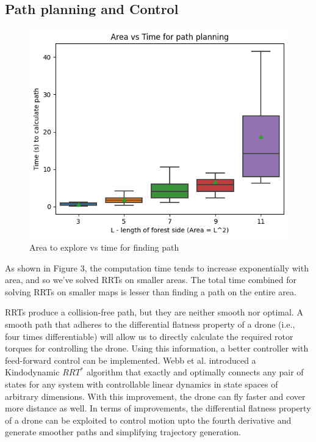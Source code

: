 \subsection{Path planning and Control}

\begin{figure}[h]
\centering
\includegraphics[scale=0.5]{images/time_area.png}
\caption{Area to explore vs time for finding path}
\end{figure}


As shown in Figure 3, the computation time tends to increase exponentially with area, and so we've solved RRTs on smaller areas.
The total time combined for solving RRTs on smaller maps is lesser than finding a path on the entire area.

RRTs produce a collision-free path, but they are neither smooth nor optimal.
A smooth path that adheres to the differential flatness property of a drone (i.e., four times differentiable) will allow us to directly calculate the required rotor torques for controlling the drone.
Using this information, a better controller with feed-forward control can be implemented.
Webb et al. introduced a Kindodynamic $RRT^*$ algorithm that exactly and optimally connects any pair of states for any system with controllable linear dynamics in state spaces of arbitrary dimensions\cite{DBLP:journals/corr/abs-1205-5088}.
With this improvement, the drone can fly faster and cover more distance as well.
In terms of improvements, the differential flatness property of a drone can be exploited to control motion upto the fourth derivative and generate smoother paths and simplifying trajectory generation.

